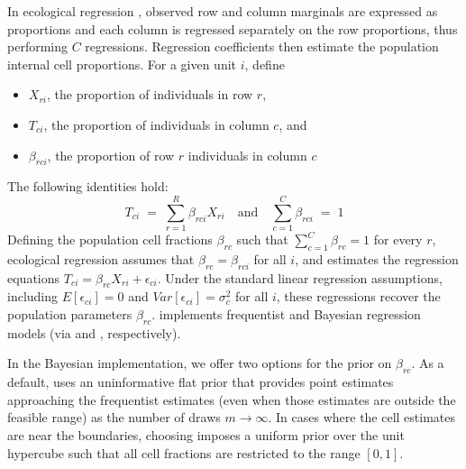 In ecological regression \citep{Goodman53}, observed row and column
marginals are expressed as proportions and each column is regressed
separately on the row proportions, thus performing $C$ regressions.  
Regression coefficients then estimate the population internal cell
proportions.  For a given unit $i$, define

\begin{itemize}
\item $X_{ri}$, the proportion of individuals in row $r$,
\item $T_{ci}$, the proportion of individuals in column $c$, and
\item $\beta_{rci}$, the proportion of row $r$ individuals in column
$c$
\end{itemize}

\noindent The following identities hold:
\begin{displaymath}
T_{ci} \; = \; \sum_{r=1}^R \beta_{rci} X_{ri} \quad \textrm{and} \quad \sum_{c=1}^{C} \beta_{rci}  \; = \; 1    
\end{displaymath}
\noindent  Defining the population cell fractions $\beta_{rc}$ such that
$\sum_{c=1}^C \beta_{rc} = 1$ for every $r$, ecological regression assumes that
$\beta_{rc} = \beta_{rci}$ for all $i$, and estimates the regression
equations $T_{ci} = \beta_{rc} X_{ri} + \epsilon_{ci}$.  Under the
standard linear regression assumptions, including $E[\epsilon_{ci}] =
0$ and $Var[\epsilon_{ci}] = \sigma_c^2$ for all $i$, these
regressions recover the population parameters $\beta_{rc}$.
 implements frequentist and Bayesian regression models (via
 and , respectively).  

In the Bayesian implementation, we offer two options for the prior on
$\beta_{rc}$.  As a default,  uses an
uninformative flat prior that provides point estimates approaching the
frequentist estimates (even when those estimates are outside the
feasible range) as the number of draws $m \to \infty$.  In cases where
the cell estimates are near the boundaries, choosing
 imposes a uniform prior over the unit
hypercube such that all cell fractions are restricted to the range
$[0,1]$.  

